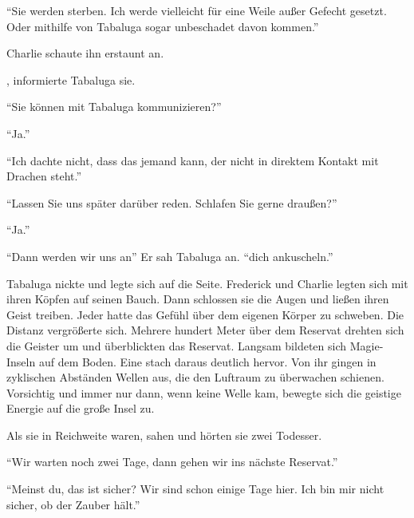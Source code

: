 \enquote{Sie werden sterben. Ich werde vielleicht für eine Weile außer Gefecht gesetzt. Oder mithilfe von Tabaluga sogar unbeschadet davon kommen.}

Charlie schaute ihn erstaunt an.

, informierte Tabaluga sie.


\enquote{Sie können mit Tabaluga kommunizieren?}

\enquote{Ja.}

\enquote{Ich dachte nicht, dass das jemand kann, der nicht in direktem Kontakt mit Drachen steht.}

\enquote{Lassen Sie uns später darüber reden. \gst Schlafen Sie gerne draußen?}

\enquote{Ja.}

\enquote{Dann werden wir uns an\abs} Er sah Tabaluga an. \enquote{\aabs dich ankuscheln.}



Tabaluga nickte und legte sich auf die Seite. Frederick und Charlie legten sich mit ihren Köpfen auf seinen Bauch. Dann schlossen sie die Augen und ließen ihren Geist treiben. Jeder hatte das Gefühl über dem eigenen Körper zu schweben. Die Distanz vergrößerte sich. Mehrere hundert Meter über dem Reservat drehten sich die Geister um und überblickten das Reservat. Langsam bildeten sich Magie-Inseln auf dem Boden. Eine stach daraus deutlich hervor. Von ihr gingen in zyklischen Abständen Wellen aus, die den Luftraum zu überwachen schienen. Vorsichtig und immer nur dann, wenn keine Welle kam, bewegte sich die geistige Energie auf die große Insel zu.

Als sie in Reichweite waren, sahen und hörten sie zwei Todesser.

\enquote{Wir warten noch zwei Tage, dann gehen wir ins nächste Reservat.}

\enquote{Meinst du, das ist sicher? Wir sind schon einige Tage hier. Ich bin mir nicht sicher, ob der Zauber hält.}


